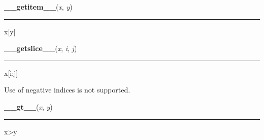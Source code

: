     \label{time:struct_time:__getitem__}

    \vspace{0.5ex}

\hspace{.8\funcindent}\begin{boxedminipage}{\funcwidth}

    \raggedright \textbf{\_\_getitem\_\_}(\textit{x}, \textit{y})

    \vspace{-1.5ex}

    \rule{\textwidth}{0.5\fboxrule}
\setlength{\parskip}{2ex}
    x[y]

\setlength{\parskip}{1ex}
    \end{boxedminipage}

    \label{time:struct_time:__getslice__}

    \vspace{0.5ex}

\hspace{.8\funcindent}\begin{boxedminipage}{\funcwidth}

    \raggedright \textbf{\_\_getslice\_\_}(\textit{x}, \textit{i}, \textit{j})

    \vspace{-1.5ex}

    \rule{\textwidth}{0.5\fboxrule}
\setlength{\parskip}{2ex}
    x[i:j]

    Use of negative indices is not supported.

\setlength{\parskip}{1ex}
    \end{boxedminipage}

    \label{time:struct_time:__gt__}

    \vspace{0.5ex}

\hspace{.8\funcindent}\begin{boxedminipage}{\funcwidth}

    \raggedright \textbf{\_\_gt\_\_}(\textit{x}, \textit{y})

    \vspace{-1.5ex}

    \rule{\textwidth}{0.5\fboxrule}
\setlength{\parskip}{2ex}
    x{\textgreater}y

\setlength{\parskip}{1ex}
    \end{boxedminipage}

